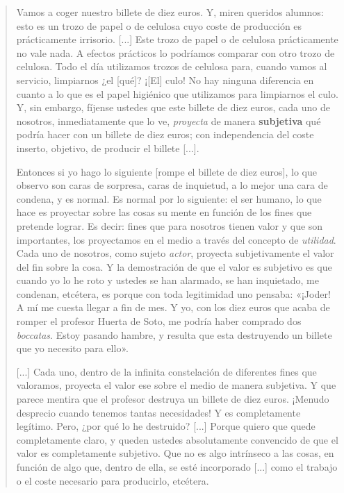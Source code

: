 \documentclass[12pt,a4paper,twoside]{book}
\begin{document}
\begin{quotation}
Vamos a coger nuestro billete de diez euros. Y, miren queridos alumnos: esto es un trozo de papel o de celulosa cuyo coste de producción es prácticamente irrisorio. [...] Este trozo de papel o de celulosa prácticamente no vale nada. A efectos prácticos lo podríamos comparar con otro trozo de celulosa. Todo el día utilizamos trozos de celulosa para, cuando vamos al servicio, limpiarnos ¿el [qué]? ¡[El] culo! No hay ninguna diferencia en cuanto a lo que es el papel higiénico que utilizamos para limpiarnos el culo. Y, sin embargo, fíjense ustedes que este billete de diez euros, cada uno de nosotros, inmediatamente que lo ve, \textit{proyecta} de manera \textbf{subjetiva} qué podría hacer con un billete de diez euros; con independencia del coste inserto, objetivo, de producir el billete [...].

Entonces si yo hago lo siguiente [rompe el billete de diez euros], lo que observo son caras de sorpresa, caras de inquietud, a lo mejor una cara de condena, y es normal. Es normal por lo siguiente: el ser humano, lo que hace es proyectar sobre las cosas su mente en función de los fines que pretende lograr. Es decir: fines que para nosotros tienen valor y que son importantes, los proyectamos en el medio a través del concepto de \textit{utilidad}. Cada uno de nosotros, como sujeto \textit{actor}, proyecta subjetivamente el valor del fin sobre la cosa. Y la demostración de que el valor es subjetivo es que cuando yo lo he roto y ustedes se han alarmado, se han inquietado, me condenan, etcétera, es porque con toda legitimidad uno pensaba: «¡Joder! A mí me cuesta llegar a fin de mes. Y yo, con los diez euros que acaba de romper el profesor Huerta de Soto, me podría haber comprado dos \textit{boccatas}. Estoy pasando hambre, y resulta que esta destruyendo un billete que yo necesito para ello».

[...] Cada uno, dentro de la infinita constelación de diferentes fines que valoramos, proyecta el valor ese sobre el medio de manera subjetiva. Y que parece mentira que el profesor destruya un billete de diez euros. ¡Menudo desprecio cuando tenemos tantas necesidades! Y es completamente legítimo. Pero, ¿por qué lo he destruido? [...] Porque quiero que quede completamente claro, y queden ustedes absolutamente convencido de que el valor es completamente subjetivo. Que no es algo intrínseco a las cosas, en función de algo que, dentro de ella, se esté incorporado [...] como el trabajo o el coste necesario para producirlo, etcétera. \cite[CT: 00:21-04:11]{huertadesoto:valor}
\end{quotation}
\end{document}
